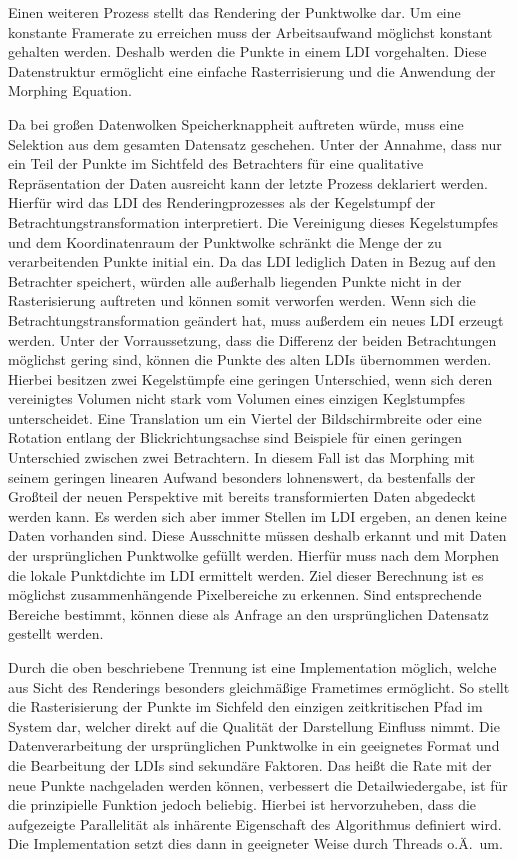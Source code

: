 \documentclass[hyperref, beleg, german]{cgvpub}
\begin{document}
Einen weiteren Prozess stellt das Rendering der Punktwolke dar. Um eine
konstante Framerate zu erreichen muss der Arbeitsaufwand möglichst konstant
gehalten werden. Deshalb werden die Punkte in einem LDI vorgehalten. Diese
Datenstruktur ermöglicht eine einfache Rasterrisierung und die Anwendung der
Morphing Equation.

Da bei großen Datenwolken Speicherknappheit auftreten würde, muss eine
Selektion aus dem gesamten Datensatz geschehen. Unter der Annahme, dass nur ein
Teil der Punkte im Sichtfeld des Betrachters für eine qualitative
Repräsentation der Daten ausreicht kann der letzte Prozess deklariert werden.
Hierfür wird das LDI des Renderingprozesses als der Kegelstumpf der
Betrachtungstransformation interpretiert. Die Vereinigung dieses Kegelstumpfes
und dem Koordinatenraum der Punktwolke schränkt die Menge der zu verarbeitenden
Punkte initial ein. Da das LDI lediglich Daten in Bezug auf den Betrachter
speichert, würden alle außerhalb liegenden Punkte nicht in der Rasterisierung
auftreten und können somit verworfen werden. Wenn sich die
Betrachtungstransformation geändert hat, muss außerdem ein neues LDI erzeugt
werden. Unter der Vorraussetzung, dass die Differenz der beiden Betrachtungen
möglichst gering sind, können die Punkte des alten LDIs übernommen werden.
Hierbei besitzen zwei Kegelstümpfe eine geringen Unterschied, wenn sich deren
vereinigtes Volumen nicht stark vom Volumen eines einzigen Keglstumpfes
unterscheidet. Eine Translation um ein Viertel der Bildschirmbreite oder eine
Rotation entlang der Blickrichtungsachse sind Beispiele für einen geringen
Unterschied zwischen zwei Betrachtern. In diesem Fall ist das Morphing mit
seinem geringen linearen Aufwand besonders lohnenswert, da bestenfalls der
Großteil der neuen Perspektive mit bereits transformierten Daten abgedeckt
werden kann. Es werden sich aber immer Stellen im LDI ergeben, an denen keine
Daten vorhanden sind. Diese Ausschnitte müssen deshalb erkannt und mit Daten
der ursprünglichen Punktwolke gefüllt werden. Hierfür muss nach dem Morphen die
lokale Punktdichte im LDI ermittelt werden. Ziel dieser Berechnung ist es
möglichst zusammenhängende Pixelbereiche zu erkennen. Sind entsprechende
Bereiche bestimmt, können diese als Anfrage an den ursprünglichen Datensatz
gestellt werden.

Durch die oben beschriebene Trennung ist eine Implementation möglich, welche
aus Sicht des Renderings besonders gleichmäßige Frametimes ermöglicht. So
stellt die Rasterisierung der Punkte im Sichfeld den einzigen zeitkritischen
Pfad im System dar, welcher direkt auf die Qualität der Darstellung Einfluss
nimmt. Die Datenverarbeitung der ursprünglichen Punktwolke in ein geeignetes
Format und die Bearbeitung der LDIs sind sekundäre Faktoren. Das heißt die Rate
mit der neue Punkte nachgeladen werden können, verbessert die Detailwiedergabe,
ist für die prinzipielle Funktion jedoch beliebig. Hierbei ist hervorzuheben,
dass die aufgezeigte Parallelität als inhärente Eigenschaft des Algorithmus
definiert wird. Die Implementation setzt dies dann in geeigneter Weise durch
Threads o.Ä.\ um.
\end{document}
